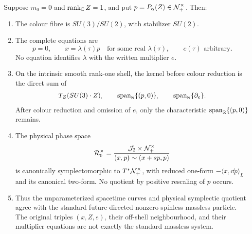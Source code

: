\begin{theorem}
\label{wpr:thm:massless}
Suppose \(m_0=0\) and \(\operatorname{rank}_{\mathbb C} Z=1\), and put
\(p=P_\alpha(Z)\in\mathcal N_+^\times\).  Then:
\begin{enumerate}[label=\textup{(\alph*)}]
\item The colour fibre is \(SU(3)/SU(2)\), with stabilizer \(SU(2)\).
\item The complete equations are
\begin{equation}
 \dot p=0,\qquad
 \dot x=\lambda(\tau)p
 \quad\text{for some real }\lambda(\tau),\qquad
 e(\tau)\text{ arbitrary}.
 \label{wpr:eq:null-EL}
\end{equation}
No equation identifies \(\lambda\) with the written multiplier \(e\).
\item On the intrinsic smooth rank-one shell, the kernel before
colour reduction is the direct sum of
\[
 T_Z(SU(3)\cdot Z),\qquad
 \operatorname{span}_{\mathbb R}\{(p,0)\},\qquad
 \operatorname{span}_{\mathbb R}\{\partial_e\}.
\]
After colour reduction and omission of \(e\), only the characteristic
\(\operatorname{span}_{\mathbb R}\{(p,0)\}\) remains.
\item The physical phase space
\[
 \mathcal R_0^\times
 =
 \frac{\mathcal J_2\times\mathcal N_+^\times}
 {(x,p)\sim(x+s p,p)}
\]
is canonically symplectomorphic to \(T^*\mathcal N_+^\times\), with reduced
one-form \(-\langle x,\dd p\rangle_L\) and its canonical two-form.
No quotient by positive rescaling of \(p\) occurs.
\item Thus the unparameterized spacetime curves and physical
symplectic quotient agree with the standard future-directed nonzero
spinless massless particle.  The original triples \((x,Z,e)\), their
off-shell neighbourhood, and their multiplier equations are not
exactly the standard massless system.
\end{enumerate}
\end{theorem}
